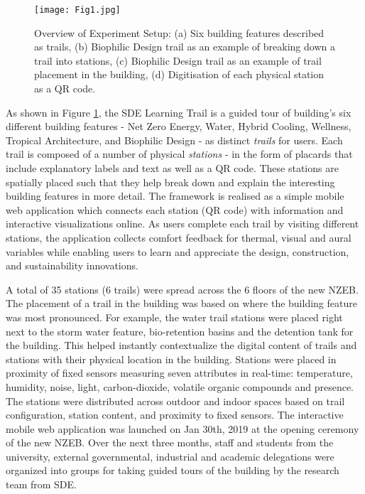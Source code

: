 
\begin{figure}
\begin{center}
\texttt{[image: Fig1.jpg]}
\caption{Overview of Experiment Setup: (a) Six building features described as trails, (b) Biophilic Design trail as an example of breaking down a trail into stations, (c) Biophilic Design trail as an example of trail placement in the building, (d) Digitisation of each physical station as a QR code.}
\label{fig:framework}
\end{center}
\end{figure}  

As shown in Figure \ref{fig:framework}, the SDE Learning Trail is a guided tour of building's six different building features - Net Zero Energy, Water, Hybrid Cooling, Wellness, Tropical Architecture, and Biophilic Design - as distinct \emph{trails} for users. Each trail is composed of a number of physical \emph{stations} - in the form of placards that include explanatory labels and text as well as a QR code. These stations are spatially placed such that they help break down and explain the interesting building features in more detail. The framework is realised as a simple mobile web application which connects each station (QR code) with information and interactive visualizations online. As users complete each trail by visiting different stations, the application collects comfort feedback for thermal, visual and aural variables while enabling users to learn and appreciate the design, construction, and sustainability innovations.

A total of 35 stations (6 trails) were spread across the 6 floors of the new NZEB. The placement of a trail in the building was based on where the building feature was most pronounced. For example, the water trail stations were placed right next to the storm water feature, bio-retention basins and the detention tank for the building. This helped instantly contextualize the digital content of trails and stations with their physical location in the building. Stations were placed in proximity of fixed sensors measuring seven attributes in real-time: temperature, humidity, noise, light, carbon-dioxide, volatile organic compounds and presence. The stations were distributed across outdoor and indoor spaces based on trail configuration, station content, and proximity to fixed sensors. The interactive mobile web application was launched on Jan 30th, 2019 at the opening ceremony of the new NZEB. Over the next three months, staff and students from the university, external governmental, industrial and academic delegations were organized into groups for taking guided tours of the building by the research team from SDE.

